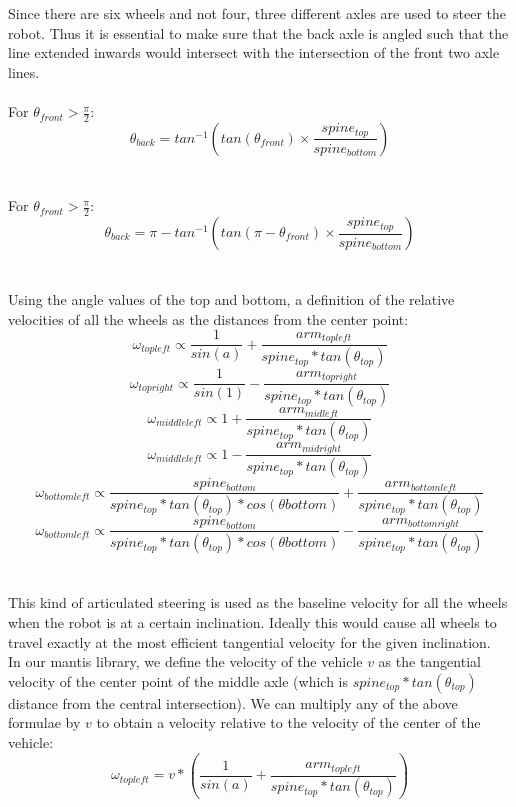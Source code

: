 \documentclass[]{article}
\begin{document}
\\
\\
Since there are six wheels and not four, three different axles are used to steer the robot. Thus it is essential to make sure that the back axle is angled such that the line extended inwards would intersect with the intersection of the front two axle lines.
\\
\\
For $\theta_{front} > \frac{\pi}{2}$:
\[ \theta_{back} = tan^{-1}(tan(\theta_{front}) \times \frac{spine_{top}}{spine_{bottom}}) \]
\\
\\
For $\theta_{front} > \frac{\pi}{2}$:
\[ \theta_{back} = \pi - tan^{-1}(tan(\pi - \theta_{front}) \times \frac{spine_{top}}{spine_{bottom}}) \]
\\
\\
Using the angle values of the top and bottom, a definition of the relative velocities of all the wheels as the distances from the center point:
\\
\[ \omega_{topleft} \propto \frac{1}{sin(a)} + \frac{arm_{topleft}}{spine_{top} * tan(\theta_{top})} \]
\[ \omega_{topright} \propto \frac{1}{sin(1)} - \frac{arm_{topright}}{spine_{top} * tan(\theta_{top})} \]
\[ \omega_{middleleft} \propto 1 + \frac{arm_{midleft}}{spine_{top} * tan(\theta_{top})} \]
\[ \omega_{middleleft} \propto 1 - \frac{arm_{midright}}{spine_{top} * tan(\theta_{top})} \]
\[ \omega_{bottomleft} \propto \frac{spine_{bottom}}{spine_{top} * tan(\theta_{top}) * cos(\theta{bottom})} + \frac{arm_{bottomleft}}{spine_{top} * tan(\theta_{top})} \]
\[ \omega_{bottomleft} \propto \frac{spine_{bottom}}{spine_{top} * tan(\theta_{top}) * cos(\theta{bottom})} - \frac{arm_{bottomright}}{spine_{top} * tan(\theta_{top})} \]
\\
\\
This kind of articulated steering is used as the baseline velocity for all the wheels when the robot is at a certain inclination. Ideally this would cause all wheels to travel exactly at the most efficient tangential velocity for the given inclination.
\\
In our mantis library, we define the velocity of the vehicle $v$ as the tangential velocity of the center point of the middle axle (which is $spine_{top} * tan(\theta_{top})$ distance from the central intersection). We can multiply any of the above formulae by $v$ to obtain a velocity relative to the velocity of the center of the vehicle:
\\
\[ \omega_{topleft} = v * (\frac{1}{sin(a)} + \frac{arm_{topleft}}{spine_{top} * tan(\theta_{top})}) \]
\end{document}

